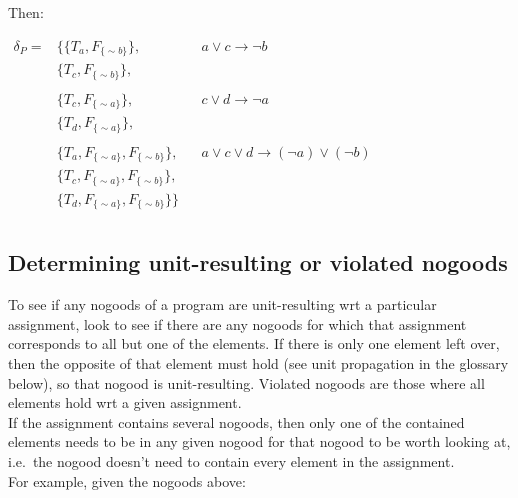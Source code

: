 \documentclass[9pt,a4paper,landscape]{article}
\newcommand{\ngfb}[1]{F_{ \{#1\} }}
\newcommand{\ngta}[1]{T_{#1}}
\begin{document}
{Then:
\begin{center}
	$\begin{array}{rlll}
	\delta_P = 	& \{ \{ \ngta{a}, \ngfb{{\sim} b} \}, && a \lor c \rightarrow \neg b \\
				& \{ \ngta{c}, \ngfb{{\sim} b} \}, && \\ &\\
				& \{ \ngta{c}, \ngfb{{\sim} a} \}, && c \lor d \rightarrow \neg a \\
				& \{ \ngta{d}, \ngfb{{\sim} a} \}, && \\ &\\
				& \{ \ngta{a}, \ngfb{{\sim} a}, \ngfb{{\sim} b} \}, && a \lor c \lor d \rightarrow (\neg a) \lor (\neg b) \\
				& \{ \ngta{c}, \ngfb{{\sim} a}, \ngfb{{\sim} b} \}, && \\			
				& \{ \ngta{d}, \ngfb{{\sim} a}, \ngfb{{\sim} b} \} \} && \\		
	\end{array}$
\end{center}


\subsection{Determining unit-resulting or violated nogoods}
\label{subsec:ng-viol}

\renewcommand{\arraystretch}{1.5}

To see if any nogoods of a program are unit-resulting wrt a particular assignment, look to see if there are any nogoods for which that assignment corresponds to all but one of the elements.
If there is only one element left over, then the opposite of that element must hold (see unit propagation in the glossary below), so that nogood is unit-resulting.
Violated nogoods are those where all elements hold wrt a given assignment.\\

If the assignment contains several nogoods, then only one of the contained elements needs to be in any given nogood for that nogood to be worth looking at, i.e.\ the nogood doesn't need to contain every element in the assignment.\\

For example, given the nogoods above:

}
\end{document}
